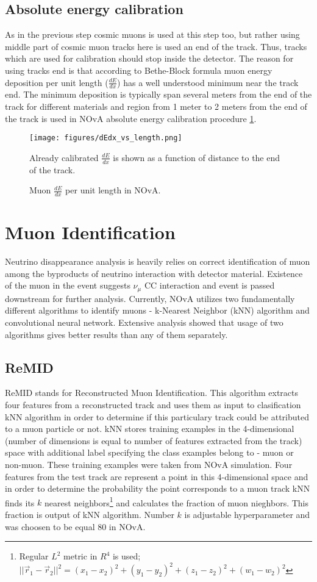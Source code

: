 \subsection{Absolute energy calibration}
As in the previous step cosmic muons is used at this step too, but rather using middle part of cosmic muon tracks
here is used an end of the track. Thus, tracks which are used for calibration should stop inside the detector. 
The reason for using tracks end is that according to Bethe-Block formula \cite{rpf} muon energy deposition per 
unit length ($\frac{dE}{dx}$) has a well understood minimum near the track end. The minimum deposition is typically
span several meters from the end of the track for different materials and region from 1 meter to 2 meters from
the end of the track is used in NOvA absolute energy calibration procedure \ref{fig:dEdx_vs_length}.
\begin{figure}[t]
\texttt{[image: figures/dEdx\_vs\_length.png]}
\centering
\caption{Muon $\frac{dE}{dx}$ per unit length in NOvA.}
{Already calibrated $\frac{dE}{dx}$ is shown as a function of distance to the end of the track.}
\label{fig:dEdx_vs_length}
\end{figure}

\section{Muon Identification}
Neutrino disappearance analysis is heavily relies on correct identification of muon among the byproducts of 
neutrino interaction with detector material. Existence of the muon in the event suggests $\nu_\mu$ CC interaction
and event is passed downstream for further analysis. Currently, NOvA utilizes two fundamentally different 
algorithms to identify muons - k-Nearest Neighbor (kNN) algorithm and convolutional neural network. Extensive 
analysis showed that usage of two algorithms gives better results than any of them separately.

\subsection{ReMID}
ReMID stands for Reconstructed Muon Identification. This algorithm extracts four features from a reconstructed
track and uses them as input to clasification kNN algorithm in order to determine if this particulary track could
be attributed to a muon particle or not. kNN stores training examples in the 4-dimensional (number of dimensions
is equal to number of features extracted from the track) space with additional label specifying the class examples
belong to - muon or non-muon. These training examples were taken from NOvA simulation. Four features from the 
test track are represent a point in this 4-dimensional space and in order to determine the probability the point 
corresponds to a muon track kNN finds its $k$ nearest neighbors\footnote{Regular $L^2$ metric in $R^4$ is used;
$||\vec{r}_1 - \vec{r}_2||^2 = (x_1-x_2)^2 + (y_1-y_2)^2 + (z_1-z_2)^2 + (w_1-w_2)^2$} and calculates the 
fraction of muon nieghbors. This fraction is output of kNN algorithm. Number $k$ is adjustable hyperparameter 
and was choosen to be equal 80 in NOvA. 

